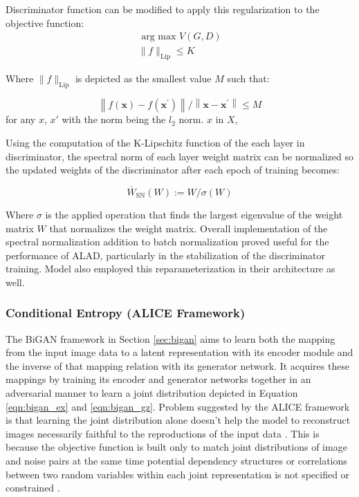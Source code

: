 Discriminator function can be modified to apply this regularization to the objective function: 
\begin{equation}
\begin{array}{l}{\text { arg max } V(G, D)} \\ {\|f\|_{\mathrm{Lip}} \leq K}\end{array} 
\end{equation}

Where $\|f\|_{\mathrm{Lip}}$ is depicted as the smallest value $M$ such that: 

\begin{equation}
    \left\|f(\boldsymbol{x})-f\left(\boldsymbol{x}^{\prime}\right)\right\| /\left\|\boldsymbol{x}-\boldsymbol{x}^{\prime}\right\| \leq M 
\end{equation}
for any $x$, $x'$ with the norm being the $l_2$ norm. $x$ in $X$,\cite{sohrab2011basic}

Using the computation of the K-Lipschitz function of the each layer in discriminator, the spectral
norm of each layer weight matrix can be normalized so the updated weights of the discriminator after
each epoch of training becomes:

\begin{equation}
    \overline{W}_{\mathrm{SN}}(W) :=W / \sigma(W) 
\end{equation}

Where $\sigma$ is the applied operation that finds the largest eigenvalue of the weight matrix $W$ that normalizes the weight matrix. Overall implementation of the spectral normalization addition to batch normalization proved useful for the performance of 
ALAD, particularly in the stabilization of the discriminator training. Model also employed this reparameterization in their 
architecture as well. 

\subsubsection{Conditional Entropy (ALICE Framework)}
\label{sec:alad_alice}

The BiGAN framework in Section \ref{sec:bigan} aims to learn both the mapping from the input image
data to a latent representation with its encoder module and the inverse of that mapping relation
with its generator network. It acquires these mappings by training its encoder and generator networks
together in an adversarial manner to learn a joint distribution depicted in Equation
\ref{eqn:bigan_ex} and \ref{eqn:bigan_gz}. Problem suggested by the ALICE
framework\cite{Li2017TowardsUA} is that learning the joint distribution alone doesn't help the model
to reconstruct images necessarily faithful to the reproductions of the input data
\cite{Li2017TowardsUA}. This is because the objective function is built only to match joint
distributions of image and noise pairs at the same time potential dependency structures or
correlations between two random variables within each joint representation is not specified or
constrained \cite{Li2017TowardsUA}.

